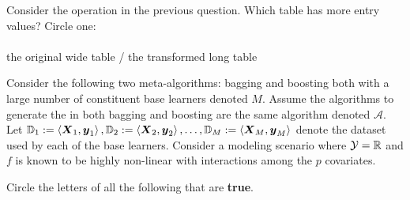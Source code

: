 \documentclass[12pt]{article}
\begin{document}
 Consider the operation in the previous question. Which table has more entry values? Circle one: \\
~\\
the original wide table / the transformed long table



\eenum

\problem Consider the following two meta-algorithms: bagging and boosting both with a large number of constituent base learners denoted $M$. Assume the algorithms to generate the  in both bagging and boosting are the same algorithm denoted $\mathcal{A}$. Let $\mathbb{D}_1 := \left<\boldsymbol{X}_1, \boldsymbol{y}_1\right>, \mathbb{D}_2 := \left<\boldsymbol{X}_2, \boldsymbol{y}_2\right>, \ldots, \mathbb{D}_M := \left<\boldsymbol{X}_M, \boldsymbol{y}_M\right>$ denote the dataset used by each of the base learners. Consider a modeling scenario where $\mathcal{Y} = \mathbb{R}$ and $f$ is known to be highly non-linear with interactions among the $p$ covariates.

\benum  

 Circle the letters of all the following that are \textbf{true}. 
\end{document}
